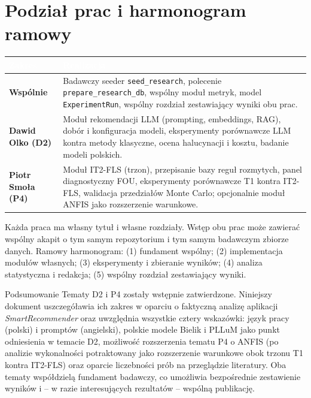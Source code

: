 \documentclass[12pt,a4paper]{article}
\begin{document}
\section{Podział prac i harmonogram ramowy}

\begin{tabularx}{\linewidth}{|>{\bfseries\color{primary}}p{3.4cm}|X|}
\hline
\rowcolor{primary}
\textcolor{white}{\textbf{Zakres}} & \textcolor{white}{\textbf{Realizacja}} \\ \hline
Wspólnie & Badawczy seeder \texttt{seed\_research}, polecenie \texttt{prepare\_research\_db}, wspólny moduł metryk, model \texttt{ExperimentRun}, wspólny rozdział zestawiający wyniki obu prac. \\ \hline
Dawid Olko (D2) & Moduł rekomendacji LLM (prompting, embeddings, RAG), dobór i konfiguracja modeli, eksperymenty porównawcze LLM kontra metody klasyczne, ocena halucynacji i kosztu, badanie modeli polskich. \\ \hline
Piotr Smoła (P4) & Moduł IT2-FLS (trzon), przepisanie bazy reguł rozmytych, panel diagnostyczny FOU, eksperymenty porównawcze T1 kontra IT2-FLS, walidacja przedziałów Monte Carlo; opcjonalnie moduł ANFIS jako rozszerzenie warunkowe. \\ \hline
\end{tabularx}

Każda praca ma własny tytuł i własne rozdziały. Wstęp obu prac może zawierać wspólny akapit o tym samym repozytorium i tym samym badawczym zbiorze danych. Ramowy harmonogram: (1) fundament wspólny; (2) implementacja modułów własnych; (3) eksperymenty i zbieranie wyników; (4) analiza statystyczna i redakcja; (5) wspólny rozdział zestawiający wyniki.

\vspace{1em}

\begin{infobox}{Podsumowanie}
Tematy D2 i P4 zostały wstępnie zatwierdzone. Niniejszy dokument uszczegóławia ich zakres w oparciu o faktyczną analizę aplikacji \emph{SmartRecommender} oraz uwzględnia wszystkie cztery wskazówki: język pracy (polski) i promptów (angielski), polskie modele Bielik i PLLuM jako punkt odniesienia w temacie D2, możliwość rozszerzenia tematu P4 o ANFIS (po analizie wykonalności potraktowany jako rozszerzenie warunkowe obok trzonu T1 kontra IT2-FLS) oraz oparcie liczebności prób na przeglądzie literatury. Oba tematy współdzielą fundament badawczy, co umożliwia bezpośrednie zestawienie wyników i -- w razie interesujących rezultatów -- wspólną publikację.
\end{infobox}
\end{document}
